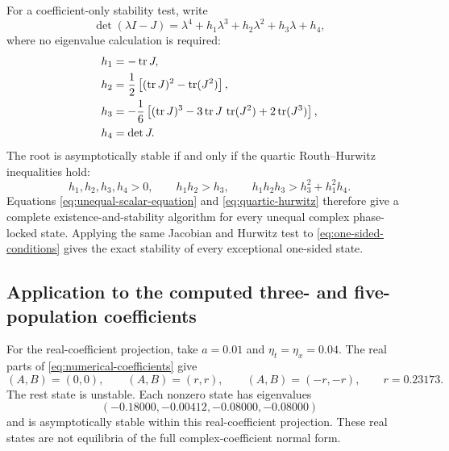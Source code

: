 For a coefficient-only stability test, write
\begin{equation}
 \det(\lambda I-J)=
 \lambda^4+h_1\lambda^3+h_2\lambda^2+h_3\lambda+h_4,
 \label{eq:quartic-characteristic}
\end{equation}
where no eigenvalue calculation is required:
\begin{align}
 h_1&=-\operatorname{tr}J,\notag\\
 h_2&=\frac12\left[(\operatorname{tr}J)^2-\operatorname{tr}(J^2)\right],
 \notag\\
 h_3&=-\frac16\left[(\operatorname{tr}J)^3
 -3\operatorname{tr}J\,\operatorname{tr}(J^2)
 +2\operatorname{tr}(J^3)\right],\notag\\
 h_4&=\det J.
 \label{eq:quartic-coefficients}
\end{align}
The root is asymptotically stable if and only if the quartic
Routh--Hurwitz inequalities hold:
\begin{equation}
 h_1,h_2,h_3,h_4>0,\qquad
 h_1h_2>h_3,\qquad
 h_1h_2h_3>h_3^2+h_1^2h_4.
 \label{eq:quartic-hurwitz}
\end{equation}
Equations \eqref{eq:unequal-scalar-equation} and
\eqref{eq:quartic-hurwitz} therefore give a complete existence-and-stability
algorithm for every unequal complex phase-locked state.  Applying the same
Jacobian and Hurwitz test to \eqref{eq:one-sided-conditions} gives the exact
stability of every exceptional one-sided state.

\subsection{Application to the computed three- and five-population coefficients}

For the real-coefficient projection, take $a=0.01$ and
$\eta_t=\eta_x=0.04$. The real parts of
\eqref{eq:numerical-coefficients} give
\begin{equation}
 (A,B)=(0,0),\qquad (A,B)=(r,r),\qquad(A,B)=(-r,-r),
 \qquad r=0.23173.
\end{equation}
The rest state is unstable. Each nonzero state has eigenvalues
\begin{equation}
 (-0.18000,-0.00412,-0.08000,-0.08000)
\end{equation}
and is asymptotically stable within this real-coefficient projection. These
real states are not equilibria of the full complex-coefficient normal form.

